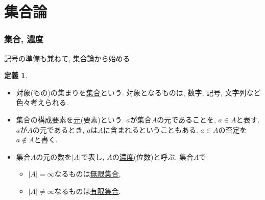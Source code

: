 \documentclass[dvipdfmx,cjk,10.2pt]{beamer}
\theoremstyle{definition}
\newtheorem{Def}[Thm]{定義}
\begin{document}


\section{集合論}

\begin{frame}
\frametitle{集合, 濃度}   

記号の準備も兼ねて, 集合論から始める. 

\begin{Def}
\begin{itemize}
\item 
対象(もの)の集まりを\underline{集合}という. 
対象となるものは, 数字, 記号, 文字列など色々考えられる. 
\item
集合の構成要素を\underline{元}(要素)という. 
$a$が集合$A$の元であることを, $a \in A$と表す. 
$a$が$A$の元であるとき, $a$は$A$に含まれるということもある. 
$a \in A$の否定を$a \notin A$と書く. 
\item 
集合$A$の元の数を$|A|$で表し, $A$の\underline{濃度}(位数)と呼ぶ. 
集合$A$で
\begin{itemize}
\item $|A|=\infty$なるものは\underline{無限集合}, 
\item $|A| \ne \infty$なるものは\underline{有限集合}. 
\end{itemize}
\end{itemize}
\end{Def}


\end{frame}

\end{document}

